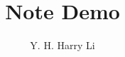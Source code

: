 \documentclass{note}
\title{Note Demo}
\author{Y. H. Harry Li}
\begin{document}
\maketitle

\begin{tip}
    \lipsum[1-1]
\end{tip}

\begin{important}
    \lipsum[1-1]
\end{important}

\begin{warning}
    \lipsum[1-1]
\end{warning}

\begin{caution}
    \lipsum[1-1]
\end{caution}

\lipsum[1-2]
\begin{mdframed}
    \lipsum[1-2]
\end{mdframed}
\end{document}
